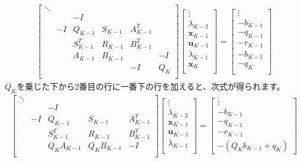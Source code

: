 \documentclass[a4paper]{jarticle}
\begin{document}
\begin{align}
\begin{bmatrix}
 \ddots & &  &  &  &  \\
& &  -I &  &  &  \\
& -I &  Q_{K-1} & S_{K-1} & A_{K-1}^T &  \\
&  &  S_{K-1}^T & R_{K-1} & B_{K-1}^T &  \\
&  & A_{K-1} & B_{K-1} &    & -I  \\
&  &   &   & -I & Q_K  \\
\end{bmatrix}
\begin{bmatrix}
\vdots\\
\lambda_{K-2}\\
\mathbf{x}_{K-1}\\
\mathbf{u}_{K-1}\\
\lambda_{K-1}\\
\mathbf{x}_{K}\\
\end{bmatrix}
=
\begin{bmatrix}
\vdots\\
-b_{K-1}\\
-q_{K-1}\\
-r_{K-1}\\
-b_{K-1}\\
-q_K\\
\end{bmatrix}
\label{eq:kkt_system_before_riccati_recursion}
\end{align}
$Q_K$を乗じた下から2番目の行に一番下の行を加えると、次式が得られます。
\begin{align*}
\begin{bmatrix}
\ddots &   &  & &\\
&  & -I & &\\
& -I &  Q_{K-1} & S_{K-1} & A_{K-1}^T \\
&  &  S_{K-1}^T & R_{K-1} & B_{K-1}^T  \\
&   & Q_KA_{K-1} & Q_KB_{K-1} &  -I \\
\end{bmatrix}
\begin{bmatrix}
\vdots\\
\lambda_{K-2}\\
\mathbf{x}_{K-1}\\
\mathbf{u}_{K-1}\\
\lambda_{K-1}\\
\end{bmatrix}
=
\begin{bmatrix}
\vdots\\
-b_{K-1}\\
-q_{K-1}\\
-r_{K-1}\\
-(Q_Kb_{K-1}+q_{K})
\end{bmatrix}
\end{align*}
\end{document}
